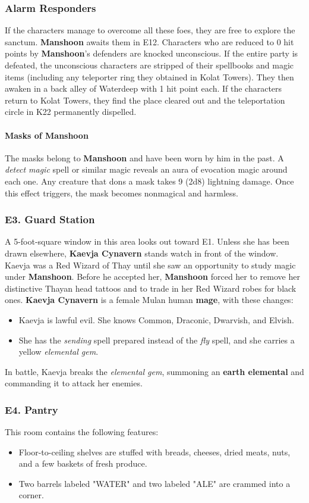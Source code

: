 \documentclass[10pt,a4paper,twoside,twocolumn,openany,nodeprecatedcode]{dndbook}
\begin{document}
\subsubsection{Alarm Responders}
If the characters manage to overcome all these foes, they are free to explore the sanctum. \textbf{Manshoon} awaits them in E12.
Characters who are reduced to 0 hit points by \textbf{Manshoon}'s defenders are knocked unconscious. If the entire party is defeated, the unconscious characters are stripped of their spellbooks and magic items (including any teleporter ring they obtained in Kolat Towers). They then awaken in a back alley of Waterdeep with 1 hit point each. If the characters return to Kolat Towers, they find the place cleared out and the teleportation circle in K22 permanently dispelled.
\paragraph{Masks of Manshoon}
The masks belong to \textbf{Manshoon} and have been worn by him in the past. A \textit{detect magic} spell or similar magic reveals an aura of evocation magic around each one. Any creature that dons a mask takes 9 (2d8) lightning damage. Once this effect triggers, the mask becomes nonmagical and harmless.
\subsubsection{E3. Guard Station}
A 5-foot-square window in this area looks out toward E1. Unless she has been drawn elsewhere, \textbf{Kaevja Cynavern} stands watch in front of the window.
Kaevja was a Red Wizard of Thay until she saw an opportunity to study magic under \textbf{Manshoon}. Before he accepted her, \textbf{Manshoon} forced her to remove her distinctive Thayan head tattoos and to trade in her Red Wizard robes for black ones.
\textbf{Kaevja Cynavern} is a female Mulan human \textbf{mage}, with these changes:
\begin{itemize}

\item Kaevja is lawful evil. She knows Common, Draconic, Dwarvish, and Elvish.
\item She has the \textit{sending} spell prepared instead of the \textit{fly} spell, and she carries a yellow \textit{elemental gem}.
\end{itemize}


In battle, Kaevja breaks the \textit{elemental gem}, summoning an \textbf{earth elemental} and commanding it to attack her enemies.
\subsubsection{E4. Pantry}
This room contains the following features:
\begin{itemize}

\item Floor-to-ceiling shelves are stuffed with breads, cheeses, dried meats, nuts, and a few baskets of fresh produce.
\item Two barrels labeled "WATER" and two labeled "ALE" are crammed into a corner.
\end{itemize}
\end{document}
